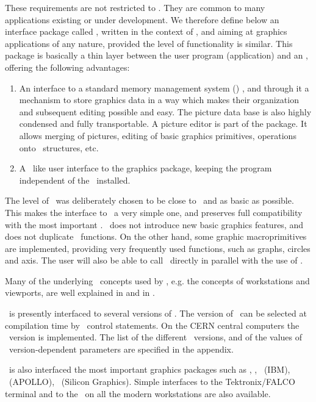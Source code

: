 \par 
These requirements are not restricted to \PAW. They are common to many 
applications existing or under development. We therefore define below an 
interface package called \HIGZ, written in the context of \PAW, and aiming at
graphics applications of any nature, provided the level of functionality is 
similar. This package is basically a
thin layer between the user program (application) and an \UGP, offering the
following advantages:
\begin{enumerate}
\item An interface to a standard memory management system (\ZEBRA)
      \cite{bib-ZEBRA}, and through it a mechanism to store graphics data in a
      way which makes their organization and subsequent editing possible and 
      easy. The picture data base is also highly condensed and fully
      transportable. A picture editor is part of the package. It allows merging
      of pictures, editing of basic graphics primitives, operations onto 
      \HIGZ~structures, etc.
\item A \GKS~like user interface to the graphics package, keeping the program
      independent of the \UGP~installed.
\end{enumerate}
The level of \HIGZ~was deliberately chosen to be close to \GKS~and as basic as
possible. This makes the interface to \GKS~a very simple one, and preserves
full compatibility with the most important \UGPs. \HIGZ~does not introduce new
basic graphics features, and does not duplicate \GKS~functions. On the other
hand, some graphic macroprimitives are implemented, providing very frequently
used functions, such as graphs, circles and axis. The user will also be able to
call \GKS~directly in parallel with the use of \HIGZ.
 
Many of the underlying \GKS~concepts used by \HIGZ, e.g. the concepts of 
workstations and viewports, are well explained in \cite{bib-GKS1} and in
\cite{bib-GKS2}.
 
\HIGZ~is presently interfaced to several versions of \GKS. The version of 
\GKS~can be selected at compilation time by \PATCHY~control statements. On the
CERN central computers the \GKSGRAL~version is implemented. The list of the
different \GKS~versions, and of the values of \GKS~version-dependent 
parameters are specified in the appendix.
 
\HIGZ~is also interfaced the most important graphics packages such as \PHIGS,
, \GDDM~(IBM), \GPR~(APOLLO), \GL~(Silicon Graphics).
Simple interfaces to the Tektronix/FALCO terminal and to the \XW~on
all the modern workstations are also available.
 
